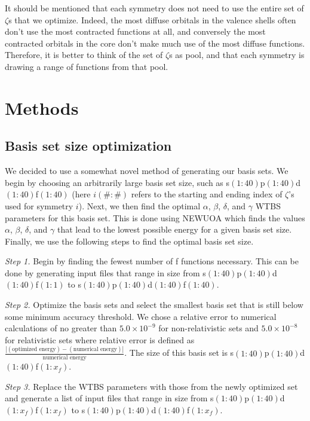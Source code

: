 It should be mentioned that each symmetry does not need to use the entire set of $\zeta$s that we optimize. Indeed, the most diffuse orbitals in the valence shells often don't use the most contracted functions at all, and conversely the most contracted orbitals in the core don't make much use of the most diffuse functions. Therefore, it is better to think of the set of $\zeta$s as pool, and that each symmetry is drawing a range of functions from that pool.  

\section{Methods}
\subsection{Basis set size optimization}
We decided to use a somewhat novel method of generating our basis sets. We begin by choosing an arbitrarily large basis set size, such as \mbox{s$(1:40)$p$(1:40)$d$(1:40)$f$(1:40)$} (here $i(\#:\#)$ refers to the starting and ending index of $\zeta$'s used for symmetry $i$). Next, we then find the optimal $\alpha$, $\beta$, $\delta$, and $\gamma$ WTBS parameters for this basis set. This is done using NEWUOA\cite{Powell2006} which finds the values $\alpha$, $\beta$, $\delta$, and $\gamma$ that lead to the lowest possible energy for a given basis set size. Finally, we use the following steps to find the optimal basis set size.

\textit{Step 1.} Begin by finding the fewest number of f functions necessary. This can be done by generating input files that range in size from  \mbox{s$(1:40)$p$(1:40)$d$(1:40)$f$(1:1)$} to  \mbox{s$(1:40)$p$(1:40)$d$(1:40)$f$(1:40)$}.

\textit{Step 2.} Optimize the basis sets and select the smallest basis set that is still below some minimum accuracy threshold. We chose a relative error to numerical calculations of no greater than $5.0\times10^{-9}$ for non-relativistic sets and $5.0\times10^{-8}$ for relativistic sets where relative error is defined as $\frac{|(\text{optimized energy}) - (\text{numerical energy})|}{\text{numerical energy}}$. The size of this basis set is  \mbox{s$(1:40)$p$(1:40)$d$(1:40)$f$(1:x_{f})$}.

\textit{Step 3.} Replace the WTBS parameters with those from the newly optimized set and generate a list of input files that range in size from  \mbox{s$(1:40)$p$(1:40)$d$(1:x_{f})$f$(1:x_{f})$} to  \mbox{s$(1:40)$p$(1:40)$d$(1:40)$f$(1:x_{f})$}.

